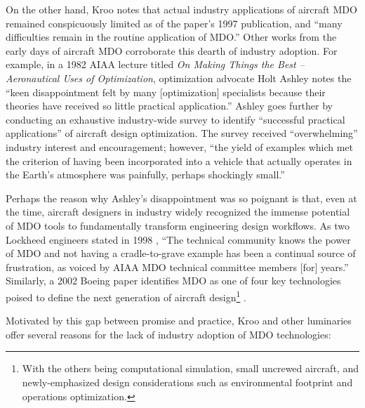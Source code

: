 \documentclass[12pt,vi,oneside]{report}
\begin{document}
    On the other hand, Kroo notes that actual industry applications of aircraft MDO remained conspicuously limited as of the paper's 1997 publication, and ``many difficulties remain in the routine application of MDO.'' \cite{kroo_multidisciplinary_1997} Other works from the early days of aircraft MDO corroborate this dearth of industry adoption. For example, in a 1982 AIAA lecture titled \textit{On Making Things the Best -- Aeronautical Uses of Optimization}, optimization advocate Holt Ashley notes the ``keen disappointment felt by many [optimization] specialists because their theories have received so little practical application.'' \cite{ashley_making_1982} Ashley goes further by conducting an exhaustive industry-wide survey to identify ``successful practical applications'' of aircraft design optimization. The survey received ``overwhelming'' industry interest and encouragement; however, ``the yield of examples which met the criterion of having been incorporated into a vehicle that actually operates in the Earth's atmosphere was painfully, perhaps shockingly small.''

    Perhaps the reason why Ashley's disappointment was so poignant is that, even at the time, aircraft designers in industry widely recognized the immense potential of MDO tools to fundamentally transform engineering design workflows. As two Lockheed engineers stated in 1998 \cite{radovcich_f22_1998}, ``The technical community knows the power of MDO and not having a cradle-to-grave example has been a continual source of frustration, as voiced by AIAA MDO technical committee members [for] years.'' Similarly, a 2002 Boeing paper identifies MDO as one of four key technologies poised to define the next generation of aircraft design\footnote{With the others being computational simulation, small uncrewed aircraft, and newly-emphasized design considerations such as environmental footprint and operations optimization.} \cite{mcmasters_airplane_2002}.

    Motivated by this gap between promise and practice, Kroo and other luminaries offer several reasons for the lack of industry adoption of MDO technologies:
\end{document}
